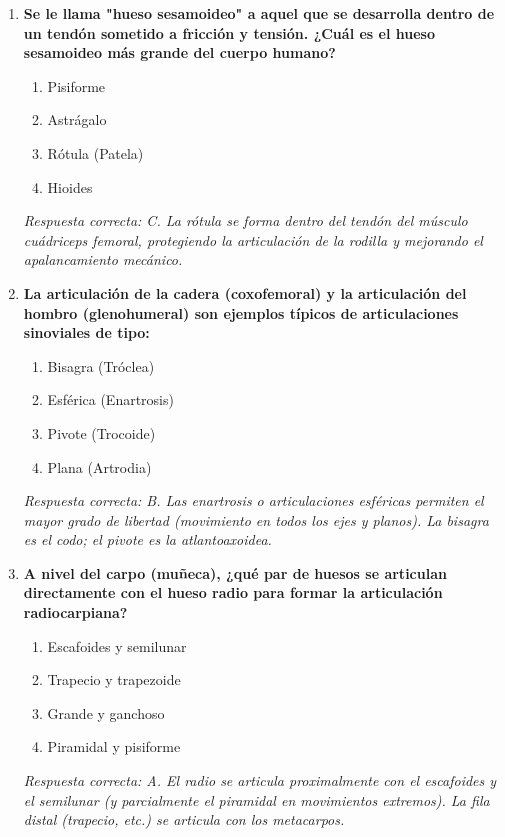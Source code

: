 \begin{enumerate}[label=\textbf{\arabic*.}]
    \item \textbf{Se le llama "hueso sesamoideo" a aquel que se desarrolla dentro de un tendón sometido a fricción y tensión. ¿Cuál es el hueso sesamoideo más grande del cuerpo humano?}
    \begin{enumerate}
        \item[A)] Pisiforme
        \item[B)] Astrágalo
        \item[C)] Rótula (Patela)
        \item[D)] Hioides
    \end{enumerate}
    \textit{Respuesta correcta: C. La rótula se forma dentro del tendón del músculo cuádriceps femoral, protegiendo la articulación de la rodilla y mejorando el apalancamiento mecánico.}

    \item \textbf{La articulación de la cadera (coxofemoral) y la articulación del hombro (glenohumeral) son ejemplos típicos de articulaciones sinoviales de tipo:}
    \begin{enumerate}
        \item[A)] Bisagra (Tróclea)
        \item[B)] Esférica (Enartrosis)
        \item[C)] Pivote (Trocoide)
        \item[D)] Plana (Artrodia)
    \end{enumerate}
    \textit{Respuesta correcta: B. Las enartrosis o articulaciones esféricas permiten el mayor grado de libertad (movimiento en todos los ejes y planos). La bisagra es el codo; el pivote es la atlantoaxoidea.}

    \item \textbf{A nivel del carpo (muñeca), ¿qué par de huesos se articulan directamente con el hueso radio para formar la articulación radiocarpiana?}
    \begin{enumerate}
        \item[A)] Escafoides y semilunar
        \item[B)] Trapecio y trapezoide
        \item[C)] Grande y ganchoso
        \item[D)] Piramidal y pisiforme
    \end{enumerate}
    \textit{Respuesta correcta: A. El radio se articula proximalmente con el escafoides y el semilunar (y parcialmente el piramidal en movimientos extremos). La fila distal (trapecio, etc.) se articula con los metacarpos.}


\end{enumerate}
